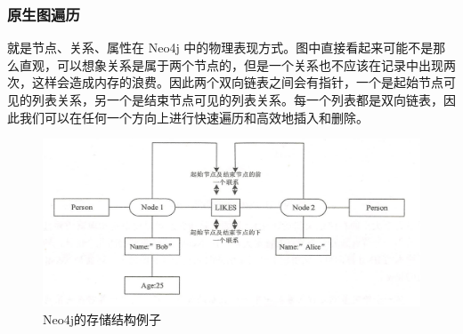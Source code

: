 \vspace{1cm}
\subsubsection{原生图遍历}

 就是节点、关系、属性在 Neo4j 中的物理表现方式。图中直接看起来可能不是那么直观，可以想象关系是属于两个节点的，但是一个关系也不应该在记录中出现两次，这样会造成内存的浪费。因此两个双向链表之间会有指针，一个是起始节点可见的列表关系，另一个是结束节点可见的列表关系。每一个列表都是双向链表，因此我们可以在任何一个方向上进行快速遍历和高效地插入和删除。
\begin{figure}[H]
	\centering
	\includegraphics[width=1\textwidth]{images/18.png}
	\caption{Neo4j的存储结构例子}
	\label{fig:neo4j-case}
\end{figure}

